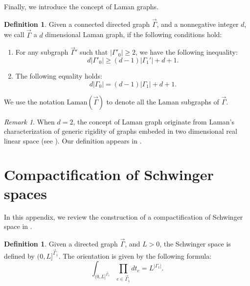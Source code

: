 \documentclass[11pt]{amsart}
\theoremstyle{definition}
\newtheorem{defn}[thm]{Definition}
\theoremstyle{remark}
\newtheorem{rem}[thm]{Remark}
\numberwithin{equation}{section}
\begin{document}
Finally, we introduce the concept of Laman graphs.

\begin{defn}
  \label{Laman graph1}Given a connected directed graph $\vec{\Gamma}$, and a nonnegative integer 
  $d$, we call $\vec{\Gamma}$ a $d$ dimensional Laman graph, if the following conditions hold:
  \begin{enumerate}
    \item For any subgraph $\vec{\Gamma}'$ such that $| \Gamma'_0 | \geqslant 2$, we
    have the following inequality:
    \begin{equation}
      d | \Gamma'_0 | \geqslant (d - 1) | \Gamma_1' | + d +
      1. \label{Laman condition1}
    \end{equation}
    \item The following equality holds:
    \begin{equation}
      d | \Gamma_0 | = (d - 1) | \Gamma_1 | + d + 1.
      \label{Laman condition2}
    \end{equation}
  \end{enumerate}
  We use the notation $\mathrm{Laman} (\vec{\Gamma})$ to denote all the Laman
  subgraphs of $\vec{\Gamma}$.
\end{defn}

\begin{rem}
  When $d = 2$, the concept of Laman graph originate from Laman's
  characterization of generic rigidity of graphs embeded in two dimensional
  real linear space (see {\cite{Laman1970OnGA}}). Our definition appears in
  {\cite{budzik2023feynman}}.
\end{rem}

\section{Compactification of Schwinger spaces}\label{Schwinger spaces}

In this appendix, we review the construction of a compactification of
Schwinger space in {\cite{wang2024feynman,Wang:2024tjf}}.

\begin{defn}
  Given a directed graph $\vec{\Gamma}$, and $L > 0$, the {{Schwinger
  space}} is defined by $(0, L]^{\vec{\Gamma}_1 }$. The orientation is given by
  the following formula:
  \[ \int_{(0, L]^{\vec{\Gamma}_1}} \prod_{e \in \vec{\Gamma}_1} d t_e = L^{| \Gamma_1
     |} . \]
\end{defn}
\end{document}

